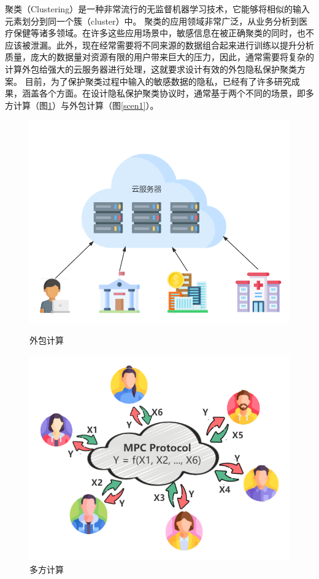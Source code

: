聚类（Clustering）是一种非常流行的无监督机器学习技术，它能够将相似的输入元素划分到同一个簇（cluster）中。
聚类的应用领域非常广泛，从业务分析到医疗保健等诸多领域。在许多这些应用场景中，敏感信息在被正确聚类的同时，也不应该被泄漏。此外，现在经常需要将不同来源的数据组合起来进行训练以提升分析质量，庞大的数据量对资源有限的用户带来巨大的压力，因此，通常需要将复杂的计算外包给强大的云服务器进行处理，这就要求设计有效的外包隐私保护聚类方案\cite{ahmed2020k}。
目前，为了保护聚类过程中输入的敏感数据的隐私，已经有了许多研究成果，涵盖各个方面。在设计隐私保护聚类协议时，通常基于两个不同的场景，即多方计算（图\ref{scen2}）与外包计算（图\ref{scen1}）。
\begin{figure}[htbp] %
	\begin{minipage}[t]{0.45\linewidth}
		\includegraphics[width=\linewidth]{img/outsource.png}
		\caption{外包计算}
		\label{scen1}
	\end{minipage}%
	\hfill%
	\begin{minipage}[t]{0.45\linewidth}
		\includegraphics[width=\linewidth]{img/mpc.png}
		\caption{多方计算}
		\label{scen2}
	\end{minipage}
\end{figure}

